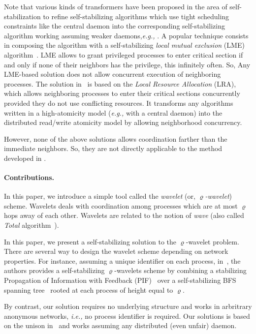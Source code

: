 \documentclass[11pt]{article}
\newcommand{\eg}{\emph{e.g., }}
\newcommand{\ie}{\emph{i.e., }}
\begin{document}
Note that various kinds of transformers have been proposed in the area of 
self-stabilization to refine self-stabilizing algorithms which use tight
scheduling constraints like the central daemon into the corresponding
self-stabilizing algorithm working assuming weaker daemons,\eg 
\cite{MN98,GH99,NA02,CDP03}. A popular technique consists in composing the 
algorithm with a self-stabilizing \emph{local mutual exclusion} (LME) 
algorithm~\cite{MN98,GH99,NA02}. 
LME allows to grant privileged processes to enter critical section if and only 
if none of their neighbors has the privilege, this infinitely often. 
So, Any LME-based solution does not allow concurrent execution of neighboring processes. 
The solution in~\cite{CDP03} is based on the \emph{Local Resource Allocation} (LRA), which 
allows neighboring processes to enter their critical sections concurrently provided
they do not use conflicting resources.
It transforms any algorithms written in a high-atomicity model (\eg with a central daemon)
into the distributed read/write atomicity model by allowing neighborhood concurrency.

However, none of the above solutions allows coordination farther than the immediate neighbors.
So, they are not directly applicable to the method developed in \cite{NS93,GGHK04,GHJT06,DNT06}.


\paragraph{Contributions.}

In this paper, we introduce a simple tool called the \emph{wavelet} (or, $\varrho$\emph{-wavelet}) scheme.  
Wavelets deals with coordination among processes which are at most $\varrho$ hops away of each other.  
Wavelets are related to the notion of \emph{wave} (also called \emph{Total} algorithm~\cite{T88,Tel94}).

In this paper, we present a self-stabilizing solution to the $\varrho$-wavelet problem.
There are several way to design the wavelet scheme depending on network properties.   
For instance, assuming a unique identifier on each process, in~\cite{DNT06}, the authors 
provides a self-stabilizing $\varrho$-wavelets scheme by combining a stabilizing Propagation of 
Information with Feedback (PIF)~\cite{BDPV99b} over a self-stabilizing BFS spanning tree~\cite{HC92,J97} 
rooted at each process of height equal to $\varrho$.  

By contrast, our solution requires no underlying structure and works in arbritrary anonymous networks, \ie
no process identifier is required.
Our solutions is based on the unison in~\cite{BPV04b} and works assuming any distributed (even unfair) daemon. 
\end{document}

